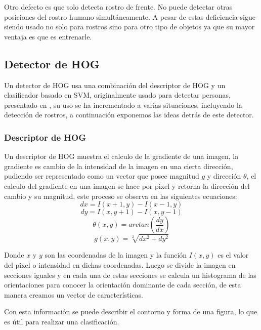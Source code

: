 Otro defecto es que solo detecta rostro de frente. No puede detectar otras posiciones del rostro humano simultáneamente. A pesar de estas deficiencia sigue siendo usado no solo para rostros sino para otro tipo de objetos ya que su mayor ventaja es que es entrenarle.

\subsection{Detector de \acf{HOG}}
Un detector de \acf{HOG} usa una combinación del descriptor de \ac{HOG} y un clasificador basado en \acf{SVM}, originalmente usado para detectar personas, presentado en \cite{dalal2005histograms}, su uso se ha incrementado a varias situaciones, incluyendo la detección de rostros, a continuación exponemos las ideas detrás de este detector.
\subsubsection{Descriptor de \ac{HOG}}
Un descriptor de \ac{HOG} muestra el calculo de la gradiente de una imagen, la gradiente es cambio de la intensidad de la imagen en una cierta dirección, pudiendo ser representado como un vector que posee magnitud $g$ y dirección $\theta$, el calculo del gradiente en una imagen se hace por pixel y retorna la dirección del cambio y su magnitud, este proceso se observa en las siguientes ecuaciones:
\begin{equation}
dx=I(x+1,y)-I(x-1,y)
\end{equation}
\begin{equation}
dy=I(x,y+1)-I(x,y-1)
\end{equation}
\begin{equation}
\theta(x,y)=arctan\left(\frac{dy}{dx}\right)
\end{equation}
\begin{equation}
g(x,y)=\sqrt[2]{dx^2+dy^2}
\end{equation}

Donde $x$ y $y$ son las coordenadas de la imagen y la función $I(x,y)$ es el valor del pixel o intensidad en dichas coordenadas. Luego se divide la imagen en secciones iguales y en cada una de estas secciones se calcula un histograma de las orientaciones para conocer la orientación dominante de cada sección, de esta manera creamos un vector de características.

Con esta información se puede describir el contorno y forma de una figura, lo que es útil para realizar una clasificación.


